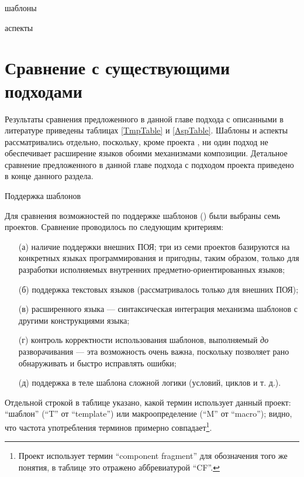 шаблоны

аспекты

\chapter{Сравнение с существующими подходами}

Результаты сравнения предложенного в данной главе подхода с описанными в литературе приведены таблицах \ref{TmpTable} и \ref{AspTable}. Шаблоны и аспекты рассматривались отдельно, поскольку, кроме проекта , ни один подход не обеспечивает расширение языков обоими механизмами композиции. Детальное сравнение предложенного в данной главе подхода с подходом проекта  приведено в конце данного раздела.

\begin{table}[htb]
	\centering
\newcommand{\dissonly}[1]{#1}

	\caption{Поддержка шаблонов}\label{TmpTable}
\end{table}

Для сравнения возможностей по поддержке шаблонов () были выбраны семь проектов. Сравнение проводилось по следующим критериям:
\begin{itemize}
	\item[(а)] наличие поддержки внешних ПОЯ; три из семи проектов базируются на конкретных языках программирования и пригодны, таким образом, только для разработки исполняемых внутренних предметно-ориентированных языков;
	\item[(б)] поддержка текстовых языков (рассматривалось только для внешних ПОЯ);
	\item[(в)]  расширенного языка --- синтаксическая интеграция механизма шаблонов с другими конструкциями языка;
	\item[(г)] контроль корректности использования шаблонов, выполняемый \emph{до} разворачивания --- эта возможность очень важна, поскольку позволяет рано обнаруживать и быстро исправлять ошибки;
	\item[(д)] поддержка в теле шаблона сложной логики (условий, циклов и т. д.).
\end{itemize}	
Отдельной строкой в таблице указано, какой термин использует данный проект: ``шаблон'' (``T'' от ``template'') или макроопределение (``M'' от ``macro''); видно, что частота употребления терминов примерно совпадает\footnote{Проект  использует термин ``component fragment'' для обозначения того же понятия, в таблице это отражено аббревиатурой ``CF''.}.
	

